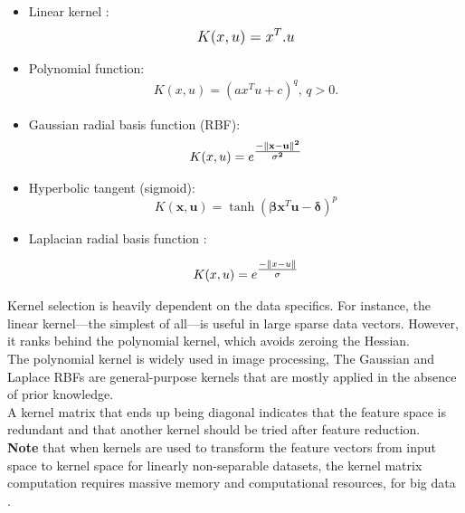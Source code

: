 \begin{itemize}

  \item  Linear kernel  : 
  \begin{align*}
  \mathlarger {K(x,u)=  x^{T}.u  }
   \end{align*}
  \item Polynomial function: 
  \begin{align*}
  K(x,u)=(ax^{T}u + c)^{q} ,\, q>0.
  \end{align*}
  \item Gaussian radial basis function (RBF): 
\begin{align*} 
 K(x,u) = e^{\mathlarger{\frac{\mathbf{-\| x -  u\|^2}}{\mathbf{\sigma^2} } }}
\end{align*}
   
  \item  Hyperbolic tangent (sigmoid):
    \begin{equation}
      K(\mathbf x, \mathbf u) = \tanh(\mathbf {\beta} \mathbf x^{T} \mathbf u - \mathbf{\delta})^p
    \end{equation}
    
    \item Laplacian radial basis function : 
    
    \begin{align*} 
      K(x,u) = e^{\mathlarger{\frac{-\| x -  u\|}{\sigma} } }
     \end{align*}
    
\end{itemize}

Kernel selection is heavily dependent on the data specifics. For instance, the linear kernel—the simplest
of all—is useful in large sparse data vectors. However, it ranks behind the polynomial kernel, which avoids
zeroing the Hessian. \\The polynomial kernel is widely used in image processing, The Gaussian and Laplace RBFs are general-purpose kernels
that are mostly applied in the absence of prior knowledge. \\A kernel matrix that ends up being diagonal indicates that the feature space is redundant and that another kernel should be tried after feature reduction.\\
\newline
\newline
\textbf{
Note} that when kernels are used to transform the feature vectors from input space to kernel space for linearly non-separable datasets, the kernel matrix computation requires massive memory and computational
resources, for big data . 

